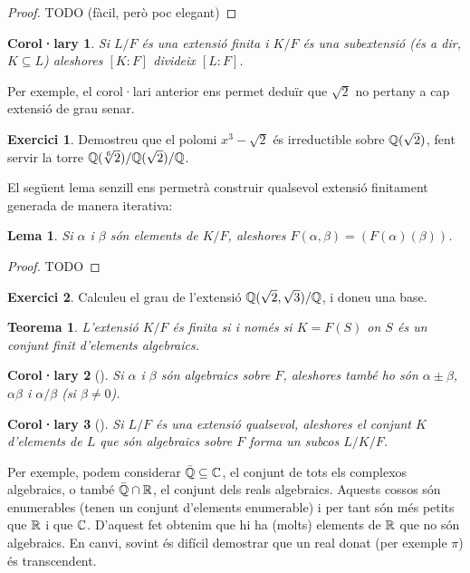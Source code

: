 \documentclass[
]{book}
\newtheorem{theorem}{Teorema}[chapter]
\newtheorem{lemma}{Lema}[chapter]
\newtheorem{corollary}{Corol·lary}[chapter]
\theoremstyle{definition}
\theoremstyle{definition}
\theoremstyle{definition}
\newtheorem{exercise}{Exercici}[chapter]
\theoremstyle{definition}
\theoremstyle{remark}
\begin{document}
\begin{proof}
TODO (fàcil, però poc elegant)
\end{proof}

\begin{corollary}
Si \(L/F\) és una extensió finita i \(K/F\) és una subextensió (és a dir, \(K\subseteq L\)) aleshores \([K\colon F]\) divideix \([L\colon F]\).
\end{corollary}

Per exemple, el corol·lari anterior ens permet deduïr que \(\sqrt{2}\) no pertany a cap extensió de grau senar.

\begin{exercise}
Demostreu que el polomi \(x^3-\sqrt{2}\) és irreductible sobre \(\mathbb{Q}(\sqrt{2})\), fent servir la torre \(\mathbb{Q}(\sqrt[6]{2}) / \mathbb{Q}(\sqrt{2}) / \mathbb{Q}\).
\end{exercise}

El següent lema senzill ens permetrà construir qualsevol extensió finitament generada de manera iterativa:

\begin{lemma}
Si \(\alpha\) i \(\beta\) són elements de \(K/F\), aleshores \(F(\alpha,\beta)=(F(\alpha)(\beta))\).
\end{lemma}

\begin{proof}
TODO
\end{proof}

\begin{exercise}
Calculeu el grau de l'extensió \(\mathbb{Q}(\sqrt{2},\sqrt{3})/\mathbb{Q}\), i doneu una base.
\end{exercise}

\begin{theorem}
L'extensió \(K/F\) és finita si i només si \(K=F(S)\) on \(S\) és un conjunt finit d'elements algebraics.
\end{theorem}

\begin{corollary}[]
Si \(\alpha\) i \(\beta\) són algebraics sobre \(F\), aleshores també ho són \(\alpha\pm \beta\), \(\alpha\beta\) i \(\alpha/\beta\) (si \(\beta\neq 0\)).
\end{corollary}

\begin{corollary}[]
Si \(L/F\) és una extensió qualsevol, aleshores el conjunt \(K\) d'elements de \(L\) que són algebraics sobre \(F\) forma un subcos \(L/K/F\).
\end{corollary}

Per exemple, podem considerar \(\bar{\mathbb{Q}}\subseteq\mathbb{C}\), el conjunt de tots els complexos algebraics, o també \(\bar{\mathbb{Q}}\cap \mathbb{R}\), el conjunt
dels reals algebraics. Aquests cossos són enumerables (tenen un conjunt d'elements enumerable) i per tant són més petits que \(\mathbb{R}\) i que \(\mathbb{C}\).
D'aquest fet obtenim que hi ha (molts) elements de \(\mathbb{R}\) que no són algebraics. En canvi, sovint és difícil demostrar que
un real donat (per exemple \(\pi\)) és transcendent.
\end{document}
